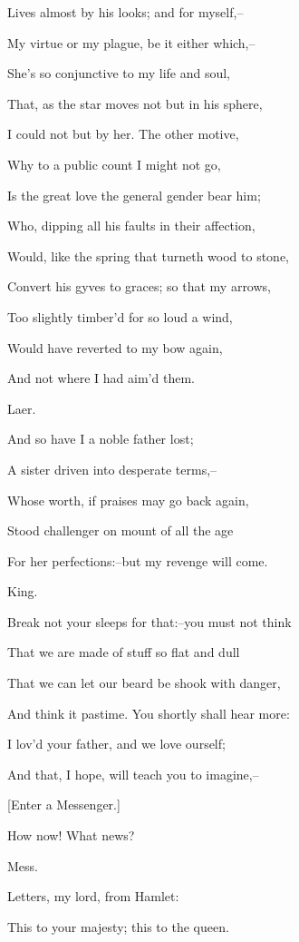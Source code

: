 \documentclass[12pt]{book}
\begin{document}
Lives almost by his looks; and for myself,--

My virtue or my plague, be it either which,--

She's so conjunctive to my life and soul,

That, as the star moves not but in his sphere,

I could not but by her. The other motive,

Why to a public count I might not go,

Is the great love the general gender bear him;

Who, dipping all his faults in their affection,

Would, like the spring that turneth wood to stone,

Convert his gyves to graces; so that my arrows,

Too slightly timber'd for so loud a wind,

Would have reverted to my bow again,

And not where I had aim'd them.



Laer.

And so have I a noble father lost;

A sister driven into desperate terms,--

Whose worth, if praises may go back again,

Stood challenger on mount of all the age

For her perfections:--but my revenge will come.



King.

Break not your sleeps for that:--you must not think

That we are made of stuff so flat and dull

That we can let our beard be shook with danger,

And think it pastime. You shortly shall hear more:

I lov'd your father, and we love ourself;

And that, I hope, will teach you to imagine,--



[Enter a Messenger.]



How now! What news?



Mess.

Letters, my lord, from Hamlet:

This to your majesty; this to the queen.
\end{document}
